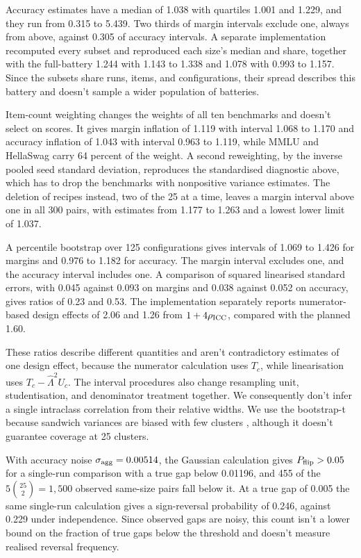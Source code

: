 Accuracy estimates have a median of 1.038 with quartiles 1.001 and 1.229, and they run from 0.315 to 5.439. Two thirds of margin intervals exclude one, always from above, against 0.305 of accuracy intervals. A separate implementation recomputed every subset and reproduced each size's median and share, together with the full-battery 1.244 with 1.143 to 1.338 and 1.078 with 0.993 to 1.157. Since the subsets share runs, items, and configurations, their spread describes this battery and doesn't sample a wider population of batteries.

Item-count weighting changes the weights of all ten benchmarks and doesn't select on scores. It gives margin inflation of 1.119 with interval 1.068 to 1.170 and accuracy inflation of 1.043 with interval 0.963 to 1.119, while MMLU and HellaSwag carry 64 percent of the weight. A second reweighting, by the inverse pooled seed standard deviation, reproduces the standardised diagnostic above, which has to drop the benchmarks with nonpositive variance estimates. The deletion of recipes instead, two of the 25 at a time, leaves a margin interval above one in all 300 pairs, with estimates from 1.177 to 1.263 and a lowest lower limit of 1.037.

A percentile bootstrap over 125 configurations gives intervals of 1.069 to 1.426 for margins and 0.976 to 1.182 for accuracy. The margin interval excludes one, and the accuracy interval includes one. A comparison of squared linearised standard errors, with 0.045 against 0.093 on margins and 0.038 against 0.052 on accuracy, gives ratios of 0.23 and 0.53. The implementation separately reports numerator-based design effects \citep{kish1965} of 2.06 and 1.26 from $1+4\rho_{\rm ICC}$, compared with the planned 1.60.

These ratios describe different quantities and aren't contradictory estimates of one design effect, because the numerator calculation uses $T_c$, while linearisation uses $T_c-\widehat\Lambda^2U_c$. The interval procedures also change resampling unit, studentisation, and denominator treatment together. We consequently don't infer a single intraclass correlation from their relative widths. We use the bootstrap-t \citep{cameron2008} because sandwich variances are biased with few clusters \citep{bell2002}, although it doesn't guarantee coverage at 25 clusters.

With accuracy noise $\sigma_{\rm agg}=0.00514$, the Gaussian calculation gives $P_{\rm flip}>0.05$ for a single-run comparison with a true gap below 0.01196, and 455 of the $5\binom{25}{2}=1{,}500$ observed same-size pairs fall below it. At a true gap of 0.005 the same single-run calculation gives a sign-reversal probability of 0.246, against 0.229 under independence. Since observed gaps are noisy, this count isn't a lower bound on the fraction of true gaps below the threshold and doesn't measure realised reversal frequency.

